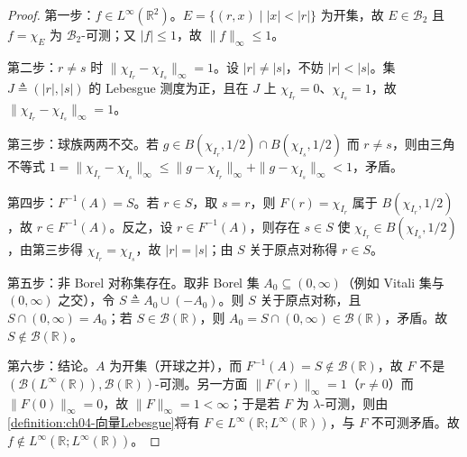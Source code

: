 \documentclass[../../main.tex]{subfiles}%
\begin{document}
\begin{proof}
第一步：$f\in L^\infty(\mathbb{R}^2)$。$E=\{(r,x)\mid|x|<|r|\}$ 为开集，故 $E\in\mathcal{B}_2$ 且 $f=\chi_E$ 为 $\mathcal{B}_2$-可测；又 $|f|\leqslant1$，故 $\|f\|_\infty\leqslant1$。

第二步：$r\neq s$ 时 $\|\chi_{I_r}-\chi_{I_s}\|_\infty=1$。设 $|r|\neq|s|$，不妨 $|r|<|s|$。集 $J\triangleq(|r|,|s|)$ 的 Lebesgue 测度为正，且在 $J$ 上 $\chi_{I_r}=0$、$\chi_{I_s}=1$，故 $\|\chi_{I_r}-\chi_{I_s}\|_\infty=1$。

第三步：球族两两不交。若 $g\in B(\chi_{I_r},1/2)\cap B(\chi_{I_s},1/2)$ 而 $r\neq s$，则由三角不等式 $1=\|\chi_{I_r}-\chi_{I_s}\|_\infty\leqslant\|g-\chi_{I_r}\|_\infty+\|g-\chi_{I_s}\|_\infty<1$，矛盾。

第四步：$F^{-1}(A)=S$。若 $r\in S$，取 $s=r$，则 $F(r)=\chi_{I_r}$ 属于 $B(\chi_{I_r},1/2)$，故 $r\in F^{-1}(A)$。反之，设 $r\in F^{-1}(A)$，则存在 $s\in S$ 使 $\chi_{I_r}\in B(\chi_{I_s},1/2)$，由第三步得 $\chi_{I_r}=\chi_{I_s}$，故 $|r|=|s|$；由 $S$ 关于原点对称得 $r\in S$。

第五步：非 Borel 对称集存在。取非 Borel 集 $A_0\subseteq(0,\infty)$（例如 Vitali 集与 $(0,\infty)$ 之交），令 $S\triangleq A_0\cup(-A_0)$。则 $S$ 关于原点对称，且 $S\cap(0,\infty)=A_0$；若 $S\in\mathcal{B}(\mathbb{R})$，则 $A_0=S\cap(0,\infty)\in\mathcal{B}(\mathbb{R})$，矛盾。故 $S\notin\mathcal{B}(\mathbb{R})$。

第六步：结论。$A$ 为开集（开球之并），而 $F^{-1}(A)=S\notin\mathcal{B}(\mathbb{R})$，故 $F$ 不是 $(\mathcal{B}(L^\infty(\mathbb{R})),\mathcal{B}(\mathbb{R}))$-可测。另一方面 $\|F(r)\|_\infty=1$（$r\neq0$）而 $\|F(0)\|_\infty=0$，故 $\|F\|_\infty=1<\infty$；于是若 $F$ 为 $\lambda$-可测，则由\cref{definition:ch04-向量Lebesgue}将有 $F\in L^\infty(\mathbb{R};L^\infty(\mathbb{R}))$，与 $F$ 不可测矛盾。故 $f\notin L^\infty(\mathbb{R};L^\infty(\mathbb{R}))$。
\end{proof}
\end{document}
